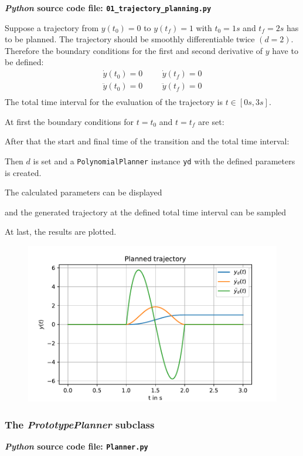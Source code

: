 \documentclass[a4paper,11pt,headings=standardclasses,parskip=half]{scrartcl}
\newcommand{\listcode}[3]{}
\newcommand{\listcodeplanning}[2]{\listcode{#1}{#2}{../sim/01_trajectory_planning.py}}
\newcommand{\py}{\emph{Python}\xspace}
\begin{document}
\textbf{\py source code file: \texttt{01\_trajectory\_planning.py}}

Suppose a trajectory from $y(t_0)=0$ to $y(t_f) = 1$ with $t_0=1s$ and $t_f = 2s$ has to be planned. The trajectory should be smoothly differentiable twice $(d=2)$. Therefore the boundary conditions for the first and second derivative of $y$ have to be defined: 
\begin{align*}
\dot{y}(t_0)=0 &&& \dot{y}(t_f)=0 \\
\ddot{y}(t_0)=0 &&& \ddot{y}(t_f)=0 \\
\end{align*}
The total time interval for the evaluation of the trajectory is $t\in[0s,3s]$.

At first the boundary conditions for $t=t_0$ and $t=t_f$ are set:
\listcodeplanning{7}{8}
After that the start and final time of the transition and the total time interval:
\listcodeplanning{9}{11}
Then $d$ is set and a \texttt{PolynomialPlanner} instance \texttt{yd} with the defined parameters is created.
\listcodeplanning{12}{13}
The calculated parameters can be displayed
\listcodeplanning{15}{16}
and the generated trajectory at the defined total time interval can be sampled
\listcodeplanning{18}{19}
At last, the results are plotted.
\listcodeplanning{21}{27}
\begin{figure}[ht]
\centering
\includegraphics[scale=0.9]{img/planned_trajectory.pdf}
\end{figure}
\subsubsection{The \emph{PrototypePlanner} subclass}

\textbf{\py source code file: \texttt{Planner.py}}
\end{document}
